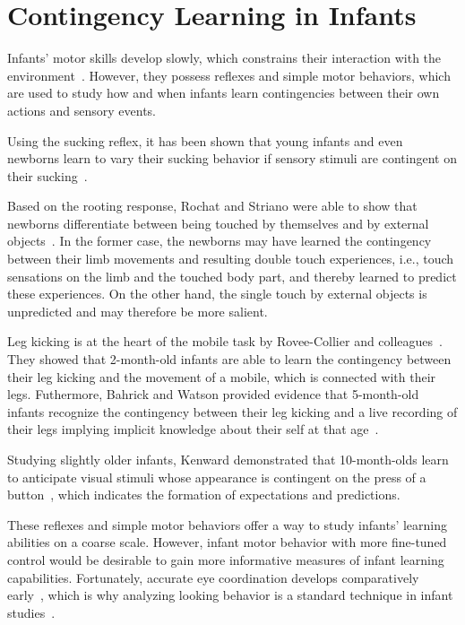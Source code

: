\documentclass[a4paper]{scrreprt}
\begin{document}
\clearpage
\section{Contingency Learning in Infants}
\label{sec:contingency_learning}

Infants' motor skills develop slowly, which constrains their interaction with the environment~\cite{rovee80,kalnins73}. However, they possess reflexes and simple motor behaviors, which are used to study how and when infants learn contingencies between their own actions and sensory events. 

Using the sucking reflex, it has been shown that young infants and even newborns learn to vary their sucking behavior if sensory stimuli are contingent on their sucking~\cite{siqueland69,decasper80,rochat99}.

Based on the rooting response, Rochat and Striano were able to show that newborns differentiate between being touched by themselves and by external objects~\cite{rochat00}. In the former case, the newborns may have learned the contingency between their limb movements and resulting double touch experiences, i.e., touch sensations on the limb and the touched body part, and thereby learned to predict these experiences. On the other hand, the single touch by external objects is unpredicted and may therefore be more salient.

Leg kicking is at the heart of the mobile task by Rovee-Collier and colleagues~\cite{rovee80,rovee01}. They showed that 2-month-old infants are able to learn the contingency between their leg kicking and the movement of a mobile, which is connected with their legs. Futhermore, Bahrick and Watson provided evidence that 5-month-old infants recognize the contingency between their leg kicking and a live recording of their legs implying implicit knowledge about their self at that age~\cite{bahrick85}.

Studying slightly older infants, Kenward demonstrated that 10-month-olds learn to anticipate visual stimuli whose appearance is contingent on the press of a button~\cite{kenward10}, which indicates the formation of expectations and predictions.

These reflexes and simple motor behaviors offer a way to study infants' learning abilities on a coarse scale. However, infant motor behavior with more fine-tuned control would be desirable to gain more informative measures of infant learning capabilities. Fortunately, accurate eye coordination develops comparatively early~\cite{bronson90,johnson91}, which is why analyzing looking behavior is a standard technique in infant studies~\cite{fantz64,cohen72,baillargeon85,haith88,quinn93,csibra99,smith03,mcmurray04,aslin07}.
\end{document}

